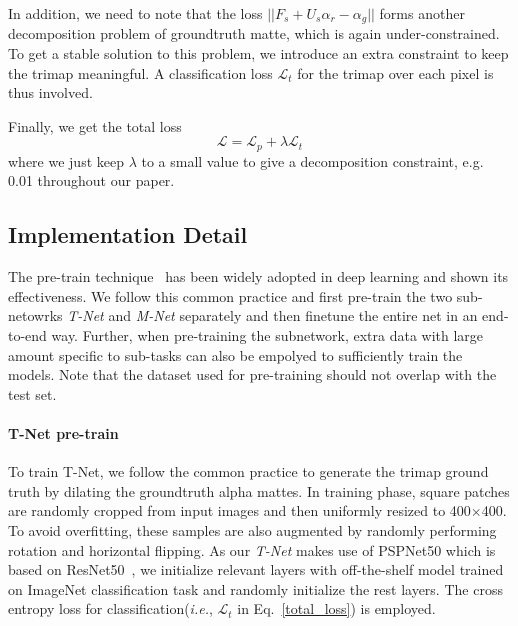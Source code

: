 In addition, we need to note that the loss $||F_{s} + U_{s}\alpha_{r} - \alpha_g||$ forms another decomposition problem of groundtruth matte, which is again under-constrained.
To get a stable solution to this problem, we introduce an extra constraint to keep the trimap meaningful.
A classification loss $\mathcal{L}_t$ for the trimap over each pixel is thus involved.


Finally, we get the total loss
\begin{equation}\label{total_loss}
\mathcal{L} = \mathcal{L}_p + \lambda \mathcal{L}_t
\end{equation}
where we just keep $\lambda$ to a small value to give a decomposition constraint, e.g. 0.01 throughout our paper.


\subsection{Implementation Detail}\label{sec_implementaton}

The pre-train technique~\cite{hinton2006fast} has been widely adopted in deep learning and shown its effectiveness.
We follow this common practice and first pre-train the two sub-netowrks \emph{T-Net} and \emph{M-Net} separately and then finetune the entire net in an end-to-end way.
Further, when pre-training the subnetwork, extra data with large amount specific to sub-tasks can also be empolyed to sufficiently train the models.
Note that the dataset used for pre-training should not overlap with the test set.

\paragraph{\textbf{T-Net pre-train}}
To train T-Net, we follow the common practice to generate the trimap ground truth by dilating the groundtruth alpha mattes.
In training phase, square patches are randomly cropped from input images and then uniformly resized to 400$\times$400.
To avoid overfitting, these samples are also augmented by randomly performing rotation and horizontal flipping.
As our \emph{T-Net} makes use of PSPNet50 which is based on ResNet50~\cite{he2016deep}, we initialize relevant layers with off-the-shelf model trained on ImageNet classification task and randomly initialize the rest layers.
The cross entropy loss for classification(\emph{i.e.}, $\mathcal{L}_t$ in Eq.~\ref{total_loss}) is employed.



